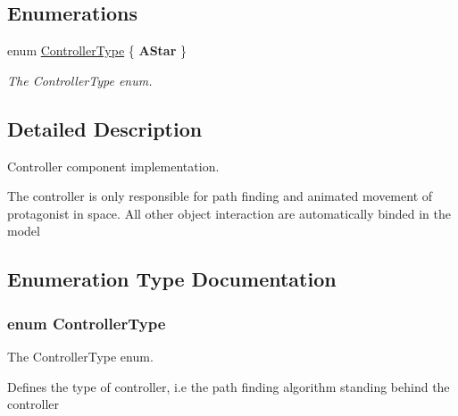 \subsection*{Enumerations}
\begin{DoxyCompactItemize}
\item 
enum \hyperlink{group__controller_ga81059b4122c9dd4608d347eb117ae8c9}{Controller\+Type} \{ {\bfseries A\+Star}
 \}\begin{DoxyCompactList}\small\item\em The Controller\+Type enum. \end{DoxyCompactList}
\end{DoxyCompactItemize}


\subsection{Detailed Description}
Controller component implementation. 

The controller is only responsible for path finding and animated movement of protagonist in space. All other object interaction are automatically binded in the model 

\subsection{Enumeration Type Documentation}
\subsubsection[{\texorpdfstring{Controller\+Type}{ControllerType}}]{\setlength{\rightskip}{0pt plus 5cm}enum {\bf Controller\+Type}}\hypertarget{group__controller_ga81059b4122c9dd4608d347eb117ae8c9}{}\label{group__controller_ga81059b4122c9dd4608d347eb117ae8c9}


The Controller\+Type enum. 

Defines the type of controller, i.\+e the path finding algorithm standing behind the controller 